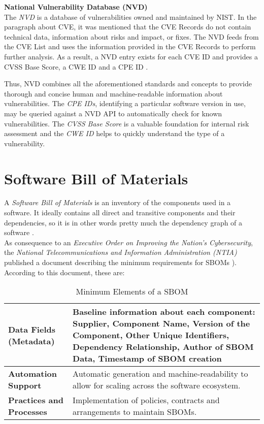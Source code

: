 \noindent
\textbf{National Vulnerability Database (NVD)}\\
\noindent
The \emph{NVD} is a database of vulnerabilities owned and maintained by NIST. In the paragraph about CVE, it was mentioned that the CVE Records do not contain technical data, information about risks and impact, or fixes. The NVD feeds from the CVE List and uses the information provided in the CVE Records to perform further analysis. As a result, a NVD entry exists for each CVE ID and provides a CVSS Base Score, a CWE ID and a CPE ID \cite{NVDWebsite}.\par 
Thus, NVD combines all the aforementioned standards and concepts to provide thorough and concise human and machine-readable information about vulnerabilities. The \textit{CPE IDs}, identifying a particular software version in use, may be queried against a NVD API to automatically check for known vulnerabilities. The \textit{CVSS Base Score} is a valuable foundation for internal risk assessment and the \textit{CWE ID} helps to quickly understand the type of a vulnerability.\\

\section{Software Bill of Materials} \label{sec:SBOM}
A \textit{Software Bill of Materials} is an inventory of the components used in a software. It ideally contains all direct and transitive components and their dependencies, so it is in other words pretty much the dependency graph of a software \cite{OWASPWebsite,NTIASBOM}.\\

As consequence to an \textit{Executive Order on Improving the Nation's Cybersecurity}, the \textit{National Telecommunications and Information Administration (NTIA)} published a document describing the minimum requirements for SBOMs \cite{ExecutiveOrderSBOM,NTIASBOM}). According to this document, these are:

\begin{table}[H]
	\begin{tabularx}{\linewidth}{|l|X|}
		\hline
		\textbf{Data Fields (Metadata)} & Baseline information about each component: Supplier, Component Name, Version of the Component, Other Unique Identifiers, Dependency Relationship, Author of SBOM Data, Timestamp of SBOM creation \\
		\hline
		\textbf{Automation Support} & Automatic generation and machine-readability to allow for scaling across the software ecosystem. \\
		\hline
		\textbf{Practices and Processes} & Implementation of policies, contracts and arrangements to maintain SBOMs.\\
		\hline
	\end{tabularx}
	\caption[Minimum Elements of a SBOM]{Minimum Elements of a SBOM }
	\label{Tab:ElementsOfSBOM}
\end{table}

